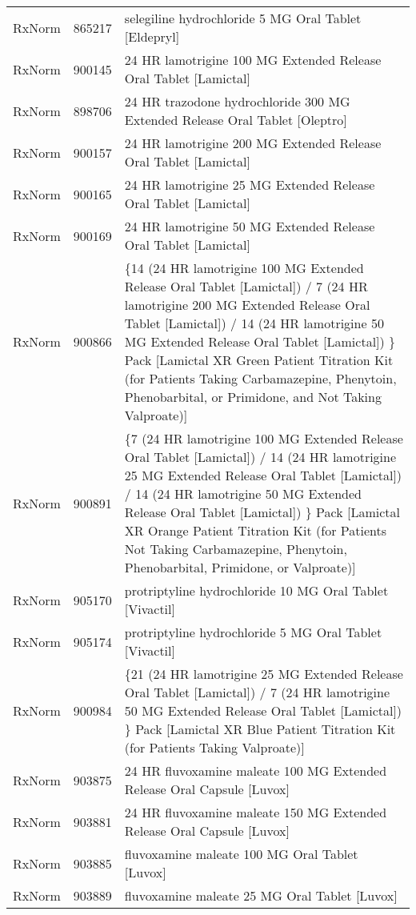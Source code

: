 \begin{longtable}{p{}p{}p{}}
  RxNorm & 865217 & selegiline hydrochloride 5 MG Oral Tablet [Eldepryl] \\ 
  RxNorm & 900145 & 24 HR lamotrigine 100 MG Extended Release Oral Tablet [Lamictal] \\ 
  RxNorm & 898706 & 24 HR trazodone hydrochloride 300 MG Extended Release Oral Tablet [Oleptro] \\ 
  RxNorm & 900157 & 24 HR lamotrigine 200 MG Extended Release Oral Tablet [Lamictal] \\ 
  RxNorm & 900165 & 24 HR lamotrigine 25 MG Extended Release Oral Tablet [Lamictal] \\ 
  RxNorm & 900169 & 24 HR lamotrigine 50 MG Extended Release Oral Tablet [Lamictal] \\ 
  RxNorm & 900866 & \{14 (24 HR lamotrigine 100 MG Extended Release Oral Tablet [Lamictal]) / 7 (24 HR lamotrigine 200 MG Extended Release Oral Tablet [Lamictal]) / 14 (24 HR lamotrigine 50 MG Extended Release Oral Tablet [Lamictal]) \} Pack [Lamictal XR Green Patient Titration Kit (for Patients Taking Carbamazepine, Phenytoin, Phenobarbital, or Primidone, and Not Taking Valproate)] \\ 
  RxNorm & 900891 & \{7 (24 HR lamotrigine 100 MG Extended Release Oral Tablet [Lamictal]) / 14 (24 HR lamotrigine 25 MG Extended Release Oral Tablet [Lamictal]) / 14 (24 HR lamotrigine 50 MG Extended Release Oral Tablet [Lamictal]) \} Pack [Lamictal XR Orange Patient Titration Kit (for Patients Not Taking Carbamazepine, Phenytoin, Phenobarbital, Primidone, or Valproate)] \\ 
  RxNorm & 905170 & protriptyline hydrochloride 10 MG Oral Tablet [Vivactil] \\ 
  RxNorm & 905174 & protriptyline hydrochloride 5 MG Oral Tablet [Vivactil] \\ 
  RxNorm & 900984 & \{21 (24 HR lamotrigine 25 MG Extended Release Oral Tablet [Lamictal]) / 7 (24 HR lamotrigine 50 MG Extended Release Oral Tablet [Lamictal]) \} Pack [Lamictal XR Blue Patient Titration Kit (for Patients Taking Valproate)] \\ 
  RxNorm & 903875 & 24 HR fluvoxamine maleate 100 MG Extended Release Oral Capsule [Luvox] \\ 
  RxNorm & 903881 & 24 HR fluvoxamine maleate 150 MG Extended Release Oral Capsule [Luvox] \\ 
  RxNorm & 903885 & fluvoxamine maleate 100 MG Oral Tablet [Luvox] \\ 
  RxNorm & 903889 & fluvoxamine maleate 25 MG Oral Tablet [Luvox] \\ 

\end{longtable}
